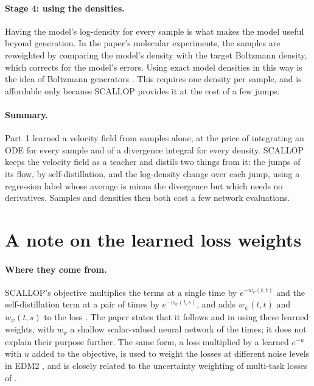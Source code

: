 \documentclass[11pt,a4paper]{article}
\numberwithin{equation}{section}     %
\theoremstyle{plain}        %
\theoremstyle{definition}   %
\theoremstyle{remark}       %
\begin{document}
\paragraph{Stage 4: using the densities.} Having the model's log-density for every sample is what makes the model useful beyond generation. In the paper's molecular experiments, the samples are reweighted by comparing the model's density with the target Boltzmann density, which corrects for the model's errors. Using exact model densities in this way is the idea of Boltzmann generators \citep{noe2019}. This requires one density per sample, and is affordable only because SCALLOP provides it at the cost of a few jumps.

\paragraph{Summary.} Part~1 learned a velocity field from samples alone, at the price of integrating an ODE for every sample and of a divergence integral for every density. SCALLOP keeps the velocity field as a teacher and distils two things from it: the jumps of its flow, by self-distillation, and the log-density change over each jump, using a regression label whose average is minus the divergence but which needs no derivatives. Samples and densities then both cost a few network evaluations.


\newpage

\section{A note on the learned loss weights}\label{sec:weights}

\paragraph{Where they come from.} SCALLOP's objective multiplies the terms at a single time by $e^{-w_\psi(t,t)}$ and the self-distillation term at a pair of times by $e^{-w_\psi(t,s)}$, and adds $w_\psi(t,t)$ and $w_\psi(t,s)$ to the loss \citep[Eq.~24]{ouyang2026}. The paper states that it follows \citet{boffi2025build} and \citet{ai2026} in using these learned weights, with $w_\psi$ a shallow scalar-valued neural network of the times; it does not explain their purpose further. The same form, a loss multiplied by a learned $e^{-u}$ with $u$ added to the objective, is used to weight the losses at different noise levels in EDM2 \citep{karras2024}, and is closely related to the uncertainty weighting of multi-task losses of \citet{kendall2018}.
\end{document}
